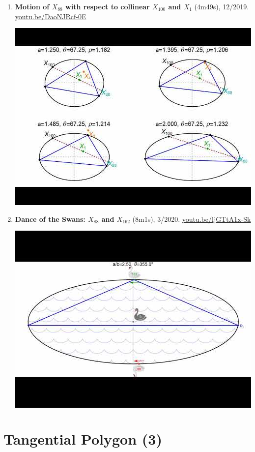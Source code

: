 \documentclass[12pt]{article}
\begin{document}
\begin{enumerate}[resume]
\item \textbf{Motion of $X_{88}$ with respect to collinear $X_{100}$ and $X_{1}$} (4m49s), 12/2019. \href{https://youtu.be/DaoNJRcf-0E}{\url{youtu.be/DaoNJRcf-0E}}
\begin{center}\includegraphics[width=.5\textwidth]{pics/DaoNJRcf-0E.jpg}\end{center}
% 
\item \textbf{Dance of the Swans: $X_{88}$ and $X_{162}$} (8m1s), 3/2020. \href{https://youtu.be/ljGTtA1x-Sk}{\url{youtu.be/ljGTtA1x-Sk}}
\begin{center}\includegraphics[width=.5\textwidth]{pics/ljGTtA1x-Sk.jpg}\end{center}
% 
\end{enumerate}

\section{Tangential Polygon (3)}
\end{document}
